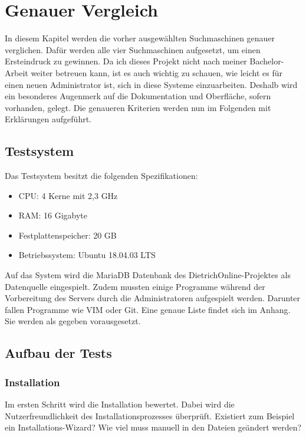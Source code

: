 \chapter{Genauer Vergleich}

In diesem Kapitel werden die vorher ausgewählten Suchmaschinen genauer verglichen. Dafür werden alle vier Suchmaschinen aufgesetzt, um einen Ersteindruck zu gewinnen. Da ich dieses Projekt nicht nach meiner Bachelor-Arbeit weiter betreuen kann, ist es auch wichtig zu schauen, wie leicht  es für einen neuen Administrator ist, sich in diese Systeme einzuarbeiten. Deshalb wird ein besonderes Augenmerk auf die Dokumentation und Oberfläche, sofern vorhanden, gelegt. Die genaueren Kriterien werden nun im Folgenden mit Erklärungen aufgeführt.

\section{Testsystem}
Das Testsystem besitzt die folgenden Spezifikationen:

\begin{itemize}
    \item CPU: 4 Kerne mit 2,3 GHz
    \item RAM: 16 Gigabyte
    \item Festplattenspeicher: 20 GB
    \item Betriebssystem: Ubuntu 18.04.03 LTS
\end{itemize} 

Auf das System wird die MariaDB Datenbank des DietrichOnline-Projektes als Datenquelle eingespielt. Zudem mussten einige Programme während der Vorbereitung des Servers durch die Administratoren aufgespielt werden. Darunter fallen Programme wie VIM oder Git. Eine genaue Liste findet sich im Anhang. Sie werden als gegeben vorausgesetzt.

\section{Aufbau der Tests}

\subsection{Installation}

Im ersten Schritt wird die Installation bewertet. Dabei wird die Nutzerfreundlichkeit des Installationsprozesses überprüft. Existiert zum Beispiel ein Installations-Wizard? Wie viel muss manuell in den Dateien geändert werden?

